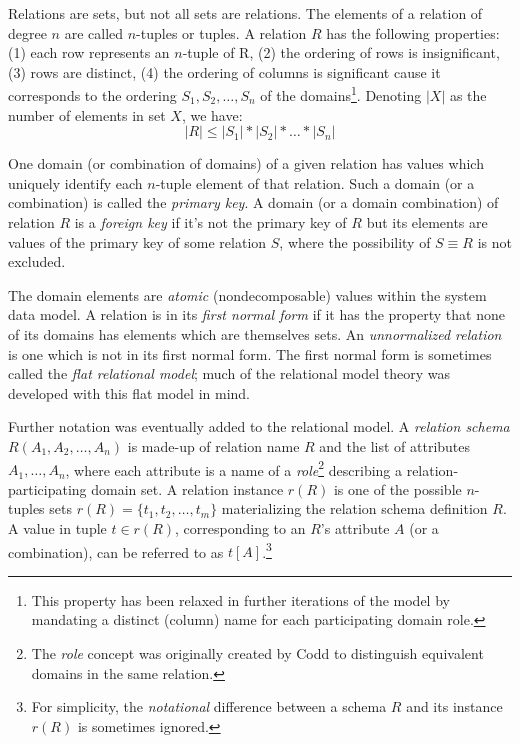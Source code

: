 \documentclass [a4paper, 12pt, twocolumn]{article}
\newcommand{\<}    {\langle}            %
\renewcommand{\>}  {\rangle}            %
\begin{document}
Relations are sets, but not all sets are relations. The elements of a
relation of degree $n$ are called $n$-tuples or tuples. A relation $R$ has
the following properties: (1) each row represents an $n$-tuple of R, (2) the
ordering of rows is insignificant, (3) rows are distinct, (4) the ordering of
columns is significant cause it corresponds to the ordering
$S_1, S_2, \ldots, S_n$ of the domains\footnote{This property has been
relaxed in further iterations of the model by mandating a distinct (column)
name for each participating domain role.}. Denoting $|X|$ as the number of
elements in set $X$, we have:
\begin{equation*}
  |R| \le |S_1| * |S_2| * \ldots * |S_n|
\end{equation*}

One domain (or combination of domains) of a given relation has values which
uniquely identify each $n$-tuple element of that relation. Such a domain (or
a combination) is called the \emph{primary key}. A domain (or a domain
combination) of relation $R$ is a \emph{foreign key} if it's not the primary
key of $R$ but its elements are values of the primary key of some relation
$S$, where the possibility of $S \equiv R$ is not excluded.

The domain elements are \emph{atomic} (nondecomposable) values within the
system data model. A relation is in its \emph{first normal form} if it has
the property that none of its domains has elements which are themselves sets.
An \emph{unnormalized relation} is one which is not in its first normal form.
The first normal form is sometimes called the \emph{flat relational model};
much of the relational model theory was developed with this flat model in
mind.

Further notation was eventually added to the relational model. A
\emph{relation schema} $R(A_1, A_2, \ldots, A_n)$ is made-up of relation name
$R$ and the list of attributes $A_1, \ldots, A_n$, where each attribute is a
name of a \emph{role}\footnote{The \emph{role} concept was originally created
by Codd to distinguish equivalent domains in the same relation.} describing a
relation-participating domain set. A relation instance $r(R)$ is one of the
possible $n$-tuples sets $r(R) = \{t_1, t_2, \ldots, t_m\}$ materializing the
relation schema definition $R$. A value in tuple $t \in r(R)$, corresponding
to an $R$'s attribute $A$ (or a combination), can be referred to as
$t[A]$.\footnote{For simplicity, the \emph{notational} difference between a
schema $R$ and its instance $r(R)$ is sometimes ignored.}
\end{document}
